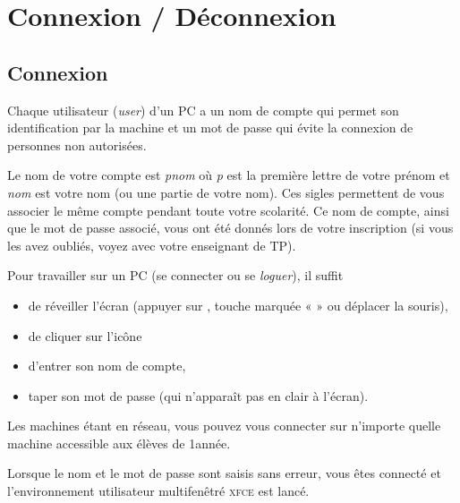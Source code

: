 \documentclass[a4paper,11pt]{article}
\newcommand{\gnome}{\textsc{xfce}\xspace}
\begin{document}
\section{Connexion / Déconnexion}

\subsection{Connexion}

Chaque utilisateur (\textit{user}) d'un PC a un nom de compte
qui permet son identification par la machine et un mot de passe qui évite la
connexion de personnes non autorisées.

Le nom de votre compte est {\sl pnom} où {\sl p} est la première lettre de
votre prénom et {\sl nom} est votre nom (ou une partie de votre nom). 
Ces sigles permettent de vous associer le même compte 
pendant toute votre scolarité.
Ce nom de compte, ainsi que le mot de passe associé, vous ont été
donnés lors de votre inscription (si vous les avez oubliés, voyez
avec votre enseignant de TP).

Pour travailler sur un PC (se connecter ou se \emph{loguer}), il suffit
\begin{itemize}
  \item de réveiller l'écran (appuyer sur \RET, touche marquée «  »
       ou déplacer la souris),
  \item de cliquer sur l'icône 
  \item d'entrer son nom de compte, 
  \item taper son mot de passe (qui n'apparaît pas en clair à l'écran).
\end{itemize}


Les machines étant en réseau, vous pouvez vous connecter sur n'importe quelle
machine accessible aux élèves de 1\iere année.


Lorsque le nom et le mot de passe sont saisis sans erreur, vous êtes connecté
et l'environnement utilisateur multifenêtré \gnome est lancé. 
\end{document}
